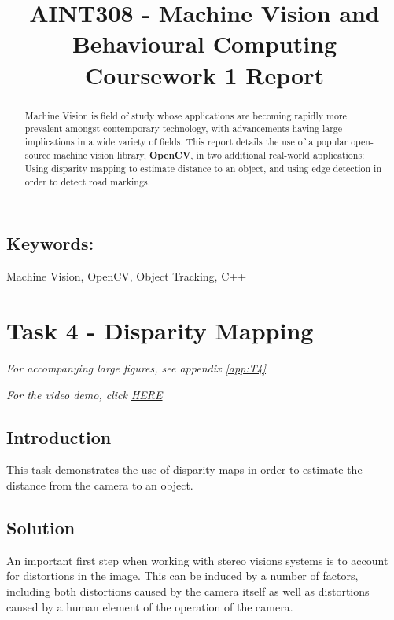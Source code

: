 \documentclass[conference]{IEEEtran}
\begin{document}
%
\title{AINT308 - Machine Vision and Behavioural Computing\\Coursework 1 Report}


\author{
}



\maketitle


\begin{abstract}
 Machine Vision is field of study whose applications are becoming rapidly more prevalent amongst contemporary technology, with advancements having large implications in a wide variety of fields. This report details the use of a popular open-source machine vision library, \textbf{OpenCV}, in two additional real-world applications: Using disparity mapping to estimate distance to an object, and using edge detection in order to detect road markings.
\end{abstract}
\subsection*{Keywords:}
Machine Vision, OpenCV, Object Tracking, C++

\section{Task 4 - Disparity Mapping}
\textit{For accompanying large figures, see appendix \ref{app:T4}}

\textit{For the video demo, click \href{https://youtu.be/kQwU62_2fdQ}{HERE}}
\subsection{Introduction}
This task demonstrates the use of disparity maps in order to estimate the distance from the camera to an object.
\subsection{Solution}
An important first step when working with stereo visions systems is to account for distortions in the image. This can be induced by a number of factors, including both distortions caused by the camera itself as well as distortions caused by a human element of the operation of the camera\cite{Distortions}.
\end{document}
